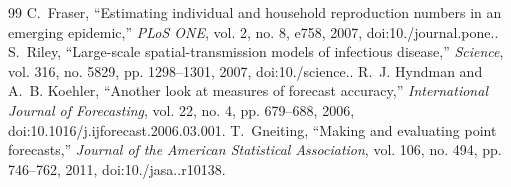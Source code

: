 \begin{thebibliography}{99}
 C.~Fraser, ``Estimating individual and household reproduction numbers in an emerging epidemic,'' \emph{PLoS ONE}, vol. 2, no. 8, e758, 2007, doi:10./\allowbreak journal.\allowbreak pone..\allowbreak 
{} S.~Riley, ``Large-scale spatial-transmission models of infectious disease,'' \emph{Science}, vol. 316, no. 5829, pp. 1298--1301, 2007, doi:10./\allowbreak science..\allowbreak 
{} R.~J. Hyndman and A.~B. Koehler, ``Another look at measures of forecast accuracy,'' \emph{International Journal of Forecasting}, vol. 22, no. 4, pp. 679--688, 2006, doi:10.1016/j.ijforecast.2006.03.001.
 T.~Gneiting, ``Making and evaluating point forecasts,'' \emph{Journal of the American Statistical Association}, vol. 106, no. 494, pp. 746--762, 2011, doi:10./\allowbreak jasa..\allowbreak r10138.\allowbreak 
\end{thebibliography}
